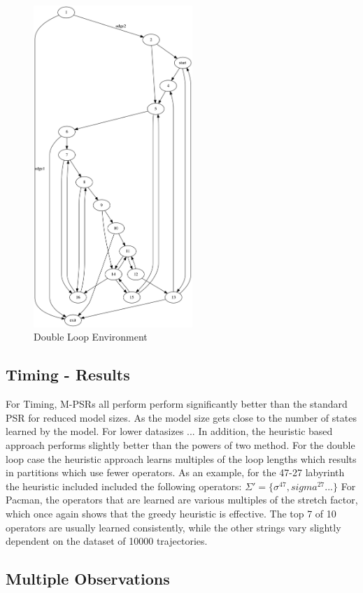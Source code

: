 \begin{figure}[ht!]
\centering
\includegraphics[width=60mm]{uCOREPICS/graphPacMan.png}
\caption{Double Loop Environment\label{overflow}}
\end{figure}

\subsection{Timing - Results}
For Timing, M-PSRs all perform perform significantly better than the standard PSR for reduced model sizes. As the model size gets close to the  number of states learned by the model. For lower datasizes ... In addition, the heuristic based approach performs slightly better than the powers of two method. For the double loop case the heuristic approach learns multiples of the loop lengths which results in partitions which use fewer operators. As an example, for the 47-27 labyrinth the heuristic included included the following operators: $\Sigma'=\{\sigma^47, sigma^27 ...\}$ For Pacman, the operators that are learned are various multiples of the stretch factor, which once again shows that the greedy heuristic is effective. The top 7 of 10 operators are usually learned consistently, while the other strings vary slightly dependent on the dataset of 10000 trajectories.

\subsection{Multiple Observations}

